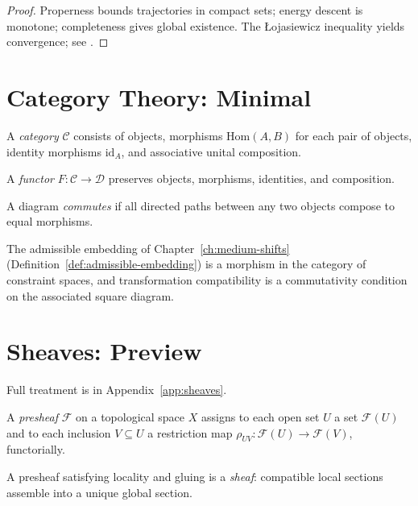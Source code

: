 \documentclass[11pt,openany]{book}
\begin{document}
\begin{proof}
Properness bounds trajectories in compact sets; energy
descent is monotone; completeness gives global existence.
The {\L}ojasiewicz inequality yields convergence;
see \citep{evans2010partial}.
\end{proof}

\section{Category Theory: Minimal}
\label{sec:category-theory}

\begin{definition}[Category]
A \emph{category} $\mathcal{C}$ consists of objects,
morphisms $\mathrm{Hom}(A,B)$ for each pair of objects,
identity morphisms $\mathrm{id}_A$, and associative unital
composition.
\end{definition}

\begin{definition}[Functor]
A \emph{functor} $F : \mathcal{C} \to \mathcal{D}$
preserves objects, morphisms, identities, and composition.
\end{definition}

\begin{definition}
A diagram \emph{commutes} if all directed paths between
any two objects compose to equal morphisms.
\end{definition}

The admissible embedding of Chapter~\ref{ch:medium-shifts}
(Definition~\ref{def:admissible-embedding}) is a morphism
in the category of constraint spaces, and
transformation compatibility is a commutativity condition
on the associated square diagram.

\section{Sheaves: Preview}
\label{sec:sheaves-preview}

Full treatment is in Appendix~\ref{app:sheaves}.

\begin{definition}
A \emph{presheaf} $\mathcal{F}$ on a topological space $X$
assigns to each open set $U$ a set $\mathcal{F}(U)$ and to
each inclusion $V \subseteq U$ a restriction map
$\rho_{UV} : \mathcal{F}(U) \to \mathcal{F}(V)$,
functorially.
\end{definition}

\begin{definition}
A presheaf satisfying locality and gluing is a
\emph{sheaf}: compatible local sections assemble into a
unique global section.
\end{definition}
\end{document}
